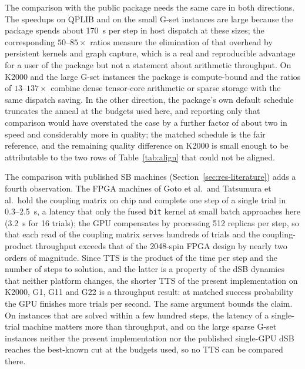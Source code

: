 \documentclass[11pt,a4paper]{article}
\newcommand{\code}[1]{\texttt{#1}}
\begin{document}
The comparison with the public package needs the same care in both directions. The speedups on QPLIB and on the small G-set instances are large because the package spends about 170~\textmu s per step in host dispatch at these sizes; the corresponding $50$--$85\times$ ratios measure the elimination of that overhead by persistent kernels and graph capture, which is a real and reproducible advantage for a user of the package but not a statement about arithmetic throughput. On K2000 and the large G-set instances the package is compute-bound and the ratios of $13$--$137\times$ combine dense tensor-core arithmetic or sparse storage with the same dispatch saving. In the other direction, the package's own default schedule truncates the anneal at the budgets used here, and reporting only that comparison would have overstated the case by a further factor of about two in speed and considerably more in quality; the matched schedule is the fair reference, and the remaining quality difference on K2000 is small enough to be attributable to the two rows of Table~\ref{tab:align} that could not be aligned.

The comparison with published SB machines (Section~\ref{sec:res-literature}) adds a fourth observation. The FPGA machines of Goto et al.\ and Tatsumura et al.\ hold the coupling matrix on chip and complete one step of a single trial in 0.3--2.5~\textmu s, a latency that only the fused \code{bit} kernel at small batch approaches here (3.2~\textmu s for 16 trials); the GPU compensates by processing 512 replicas per step, so that each read of the coupling matrix serves hundreds of trials and the coupling-product throughput exceeds that of the 2048-spin FPGA design by nearly two orders of magnitude. Since TTS is the product of the time per step and the number of steps to solution, and the latter is a property of the dSB dynamics that neither platform changes, the shorter TTS of the present implementation on K2000, G1, G11 and G22 is a throughput result: at matched success probability the GPU finishes more trials per second. The same argument bounds the claim. On instances that are solved within a few hundred steps, the latency of a single-trial machine matters more than throughput, and on the large sparse G-set instances neither the present implementation nor the published single-GPU dSB reaches the best-known cut at the budgets used, so no TTS can be compared there.
\end{document}
